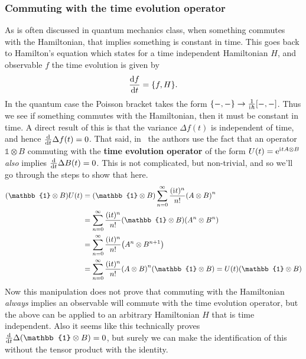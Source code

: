 \documentclass[11pt,english]{article}
\theoremstyle{definition}
\newcommand{\iu}{\mathrm{i}\mkern1mu}
\newcommand{\e}{\mathrm{e}}
\begin{document}
\subsubsection{Commuting with the time evolution operator}\label{sec:commuting-with-time}
As is often discussed in quantum mechanics class, when something commutes with the Hamiltonian, that implies something is constant in time. This goes back to Hamilton's equation which states for a time independent Hamiltonian $H$, and observable $f$ the time evolution is given by
\begin{equation*}
	\dv{f}{t} = \pb{f}{H}.
\end{equation*}
In the quantum case the Poisson bracket takes the form $\pb{-}{-}\to\frac{1}{\iu\hbar}\comm{-}{-}$. Thus we see if something commutes with the Hamiltonian, then it must be constant in time. A direct result of this is that the variance $\Delta f(t)$ is independent of time, and hence $\dv{t}\Delta f(t) = 0$. That said, in~\cite{dynamic-entropies} the authors use the fact that an operator $\mathbb{1}\otimes B$ commuting with the \textbf{time evolution operator} of the form $U(t) = \e^{\iu t A\otimes B}$ \emph{also} implies $\dv{t}\Delta B(t) = 0$. This is not complicated, but non-trivial, and so we'll go through the steps to show that here.
\begin{align*}
	\qty(\mathbb{1}\otimes B)U(t) & = \qty(\mathbb{1}\otimes B)\sum_{n = 0}^\infty\frac{(\iu t)^n}{n!}\qty(A\otimes B)^n                                  \\
	                              & = \sum_{n = 0}^\infty\frac{(\iu t)^n}{n!}\qty(\mathbb{1}\otimes B)\qty(A^n\otimes B^n)                                \\
	                              & = \sum_{n = 0}^\infty\frac{(\iu t)^n}{n!}\qty(A^n\otimes B^{n+1})                                                     \\
	                              & = \sum_{n = 0}^\infty\frac{(\iu t)^n}{n!}\qty(A\otimes B)^n\qty(\mathbb{1}\otimes B)  = U(t)\qty(\mathbb{1}\otimes B)
\end{align*}
Now this manipulation does not prove that commuting with the Hamiltonian \emph{always} implies an observable will commute with the time evolution operator, but the above can be applied to an arbitrary Hamiltonian $H$ that is time independent. Also it seems like this technically proves $\dv{t}\Delta(\mathbb{1}\otimes B) = 0$, but surely we can make the identification of this without the tensor product with the identity.
\end{document}
